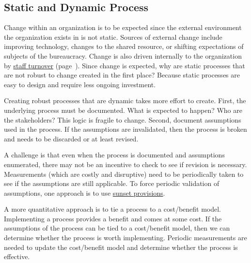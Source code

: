 \subsection*{Static and Dynamic Process\label{sec:static-dynamic-processes}}


Change within an \gls{organization} is to be expected since the external environment the organization exists in is not static. Sources of external change include improving technology,  changes to the \gls{shared resource}, or shifting expectations of subjects of the bureaucracy.
Change is also driven internally to the organization by \hyperref[sec:turnover]{staff turnover} 
(page~\pageref{sec:turnover}).
Since change is expected, why are static processes that are not robust to change created in the first place? Because static processes are easy to design and require less ongoing investment.

Creating robust processes that are dynamic takes more effort to create. First, the underlying process must be documented. What is expected to happen? Who are the stakeholders? This logic is fragile to change. Second, document assumptions used in the process. If the assumptions are invalidated, then the process is broken and needs to be discarded or at least revised. 

A challenge is that even when the process is documented and assumptions enumerated, there may not be an incentive to check to see if revision is necessary. Measurements (which are costly and disruptive) need to be periodically taken to see if the assumptions are still applicable. To force periodic validation of assumptions, one approach is to use \href{https://en.wikipedia.org/wiki/Sunset_provision}{sunset provisions}. 

A more quantitative approach is to tie a process to a cost/benefit model. Implementing a process provides a benefit and comes at some cost. If the assumptions of the process can be tied to a cost/benefit model, then we can determine whether the process is worth implementing. Periodic measurements are needed to update the cost/benefit model and determine whether the process is effective.

\ \\

